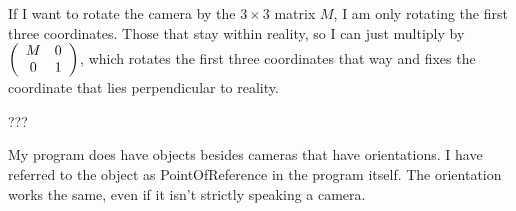 If I want to rotate the camera by the $3 \times 3$ matrix $M$, I am only rotating the first three coordinates. Those that stay within reality, so I can just multiply by $\left(\begin{array}{ccc} M & 0 \\0 & 1 \end{array} \right)$, which rotates the first three coordinates that way and fixes the coordinate that lies perpendicular to reality.

???

My program does have objects besides cameras that have orientations. I have referred to the object as PointOfReference in the program itself. The orientation works the same, even if it isn't strictly speaking a camera.